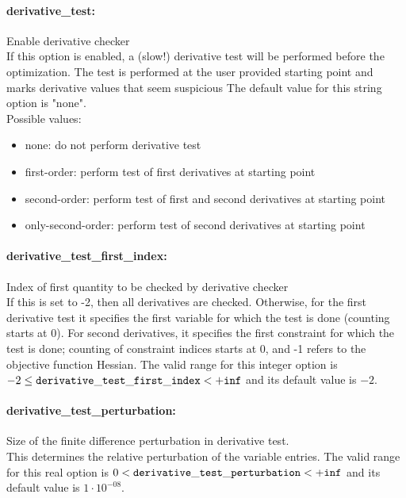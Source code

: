 \paragraph{derivative\_test:}\label{sec:derivative_test} Enable derivative checker $\;$ \\
 If this option is enabled, a (slow!) derivative
test will be performed before the optimization. 
The test is performed at the user provided
starting point and marks derivative values that
seem suspicious
The default value for this string option is "none".
\\ 
Possible values:
\begin{itemize}
   \item none: do not perform derivative test
   \item first-order: perform test of first derivatives at starting
point
   \item second-order: perform test of first and second derivatives at
starting point
   \item only-second-order: perform test of second derivatives at starting
point
\end{itemize}

\paragraph{derivative\_test\_first\_index:}\label{sec:derivative_test_first_index} Index of first quantity to be checked by derivative checker $\;$ \\
 If this is set to -2, then all derivatives are
checked.  Otherwise, for the first derivative
test it specifies the first variable for which
the test is done (counting starts at 0).  For
second derivatives, it specifies the first
constraint for which the test is done; counting
of constraint indices starts at 0, and -1 refers
to the objective function Hessian. The valid range for this integer option is
$-2 \le {\tt derivative\_test\_first\_index } <  {\tt +inf}$
and its default value is $-2$.


\paragraph{derivative\_test\_perturbation:}\label{sec:derivative_test_perturbation} Size of the finite difference perturbation in derivative test. $\;$ \\
 This determines the relative perturbation of the
variable entries. The valid range for this real option is 
$0 <  {\tt derivative\_test\_perturbation } <  {\tt +inf}$
and its default value is $1 \cdot 10^{-08}$.


